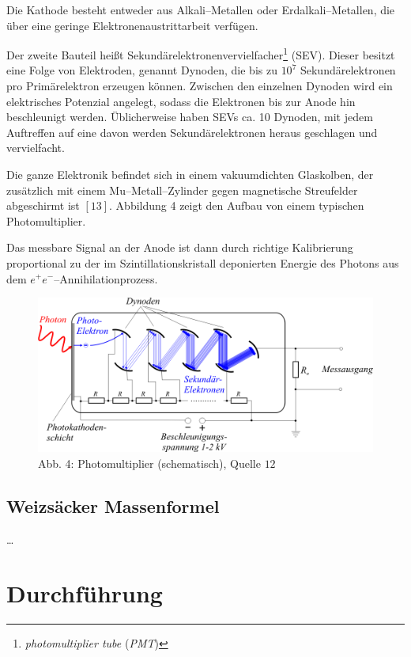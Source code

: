 \documentclass[12pt,a4paper]{scrartcl}
\numberwithin{equation}{section} %
\renewcommand{\[}{} %
\renewcommand{\]}{\noindent} %
\begin{document}
Die Kathode besteht entweder aus Alkali--Metallen oder
Erdalkali--Metallen, die über eine geringe Elektronenaustrittarbeit
verfügen.

Der zweite Bauteil heißt Sekundärelektronenvervielfacher\footnote{\emph{photomultiplier
  tube} (\emph{PMT})} (SEV). Dieser besitzt eine Folge von Elektroden,
genannt Dynoden, die bis zu \(10^7\) Sekundärelektronen pro
Primärelektron erzeugen können. Zwischen den einzelnen Dynoden wird ein
elektrisches Potenzial angelegt, sodass die Elektronen bis zur Anode hin
beschleunigt werden. Üblicherweise haben SEVs ca. 10 Dynoden, mit jedem
Auftreffen auf eine davon werden Sekundärelektronen heraus geschlagen
und vervielfacht.

Die ganze Elektronik befindet sich in einem vakuumdichten Glaskolben,
der zusätzlich mit einem Mu--Metall--Zylinder gegen magnetische
Streufelder abgeschirmt ist \([13]\). Abbildung 4 zeigt den Aufbau von
einem typischen Photomultiplier.

Das messbare Signal an der Anode ist dann durch richtige Kalibrierung
proportional zu der im Szintillationskristall deponierten Energie des
Photons aus dem \(e^+ e^-\)--Annihilationprozess.

\begin{figure}
\centering
\includegraphics{../media/B3.4/Photomultiplier_schema_de.png}
\caption{Abb. 4: Photomultiplier (schematisch), Quelle \(12\)}
\end{figure}

\hypertarget{weizsuxe4cker-massenformel}{%
\subsection{Weizsäcker Massenformel}\label{weizsuxe4cker-massenformel}}

\ldots{}

\clearpage
\hypertarget{durchfuxfchrung}{%
\section{Durchführung}\label{durchfuxfchrung}}
\end{document}
